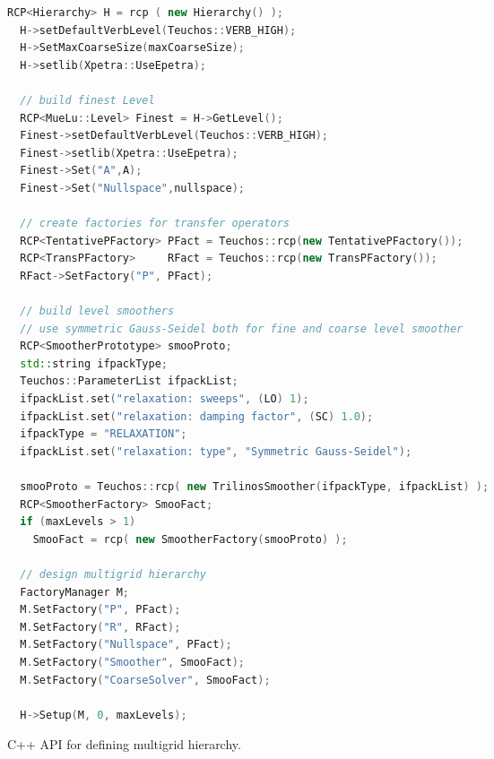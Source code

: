 \documentclass[12pt,a4paper]{article}
\begin{document}
\begin{Listing}
\begin{center}
\begin{lstlisting}[language=c++]
  RCP<Hierarchy> H = rcp ( new Hierarchy() );
  H->setDefaultVerbLevel(Teuchos::VERB_HIGH);
  H->SetMaxCoarseSize(maxCoarseSize);
  H->setlib(Xpetra::UseEpetra);

  // build finest Level
  RCP<MueLu::Level> Finest = H->GetLevel();
  Finest->setDefaultVerbLevel(Teuchos::VERB_HIGH);
  Finest->setlib(Xpetra::UseEpetra);
  Finest->Set("A",A);
  Finest->Set("Nullspace",nullspace);

  // create factories for transfer operators
  RCP<TentativePFactory> PFact = Teuchos::rcp(new TentativePFactory());
  RCP<TransPFactory>     RFact = Teuchos::rcp(new TransPFactory());
  RFact->SetFactory("P", PFact);

  // build level smoothers
  // use symmetric Gauss-Seidel both for fine and coarse level smoother
  RCP<SmootherPrototype> smooProto;
  std::string ifpackType;
  Teuchos::ParameterList ifpackList;
  ifpackList.set("relaxation: sweeps", (LO) 1);
  ifpackList.set("relaxation: damping factor", (SC) 1.0);
  ifpackType = "RELAXATION";
  ifpackList.set("relaxation: type", "Symmetric Gauss-Seidel");

  smooProto = Teuchos::rcp( new TrilinosSmoother(ifpackType, ifpackList) );
  RCP<SmootherFactory> SmooFact;
  if (maxLevels > 1)
    SmooFact = rcp( new SmootherFactory(smooProto) );

  // design multigrid hierarchy
  FactoryManager M;
  M.SetFactory("P", PFact);
  M.SetFactory("R", RFact);
  M.SetFactory("Nullspace", PFact);
  M.SetFactory("Smoother", SmooFact);
  M.SetFactory("CoarseSolver", SmooFact);

  H->Setup(M, 0, maxLevels);
\end{lstlisting}
\caption{C++ API for defining multigrid hierarchy.}
\label{listing:CppAPI}
\end{center}
\end{Listing}
\end{document}
